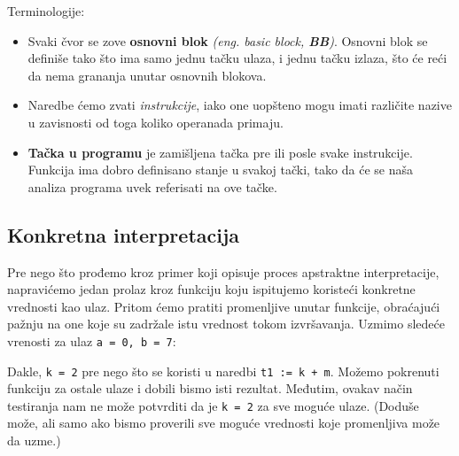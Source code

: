 Terminologije:
\begin{itemize}
\item Svaki čvor se zove \textbf{osnovni blok} \emph{(eng. basic block, \textbf{BB})}.
Osnovni blok se definiše tako što ima samo jednu tačku ulaza, i jednu tačku izlaza,
što će reći da nema grananja unutar osnovnih blokova.
\item Naredbe ćemo zvati \emph{instrukcije}, iako one uopšteno mogu imati
različite nazive u zavisnosti od toga koliko operanada primaju.
\item \textbf{Tačka u programu} je zamišljena tačka pre ili posle svake instrukcije.
Funkcija ima dobro definisano stanje u svakoj tački, tako da će se naša analiza
programa uvek referisati na ove tačke.
\end{itemize}


\subsection{Konkretna interpretacija}
\label{subsec:concreteimpr}
Pre nego što prođemo kroz primer koji opisuje proces apstraktne interpretacije,
napravićemo jedan prolaz kroz funkciju koju ispitujemo koristeći konkretne vrednosti
kao ulaz. Pritom ćemo pratiti promenljive unutar funkcije, obraćajući pažnju na
one koje su zadržale istu vrednost tokom izvršavanja. Uzmimo sledeće vrenosti za ulaz
\texttt{a = 0, b = 7}:

Dakle, \texttt{k = 2} pre nego što se koristi u naredbi \texttt{t1 := k + m}.
Možemo pokrenuti funkciju za ostale ulaze i dobili bismo isti rezultat.
Međutim, ovakav način testiranja nam ne može potvrditi da je \texttt{k = 2} za
sve moguće ulaze. (Doduše može, ali samo ako bismo proverili sve moguće vrednosti
koje promenljiva može da uzme.)


